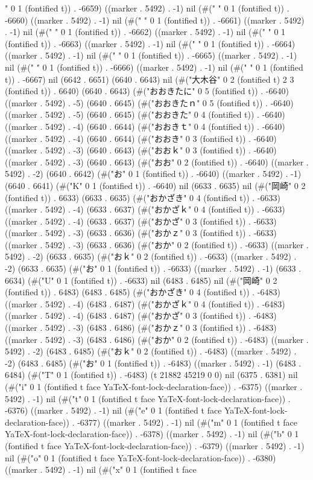" 0 1 (fontified t)) . -6659) ((marker . 5492) . -1) nil (#("	" 0 1 (fontified t)) . -6660) ((marker . 5492) . -1) nil (#(" " 0 1 (fontified t)) . -6661) ((marker . 5492) . -1) nil (#(" " 0 1 (fontified t)) . -6662) ((marker . 5492) . -1) nil (#(" " 0 1 (fontified t)) . -6663) ((marker . 5492) . -1) nil (#(" " 0 1 (fontified t)) . -6664) ((marker . 5492) . -1) nil (#(" " 0 1 (fontified t)) . -6665) ((marker . 5492) . -1) nil (#(" " 0 1 (fontified t)) . -6666) ((marker . 5492) . -1) nil (#(" " 0 1 (fontified t)) . -6667) nil (6642 . 6651) (6640 . 6643) nil (#("大木谷" 0 2 (fontified t) 2 3 (fontified t)) . 6640) (6640 . 6643) (#("おおきたに" 0 5 (fontified t)) . -6640) ((marker . 5492) . -5) (6640 . 6645) (#("おおきたｎ" 0 5 (fontified t)) . -6640) ((marker . 5492) . -5) (6640 . 6645) (#("おおきた" 0 4 (fontified t)) . -6640) ((marker . 5492) . -4) (6640 . 6644) (#("おおきｔ" 0 4 (fontified t)) . -6640) ((marker . 5492) . -4) (6640 . 6644) (#("おおき" 0 3 (fontified t)) . -6640) ((marker . 5492) . -3) (6640 . 6643) (#("おおｋ" 0 3 (fontified t)) . -6640) ((marker . 5492) . -3) (6640 . 6643) (#("おお" 0 2 (fontified t)) . -6640) ((marker . 5492) . -2) (6640 . 6642) (#("お" 0 1 (fontified t)) . -6640) ((marker . 5492) . -1) (6640 . 6641) (#("K" 0 1 (fontified t)) . -6640) nil (6633 . 6635) nil (#("岡崎" 0 2 (fontified t)) . 6633) (6633 . 6635) (#("おかざき" 0 4 (fontified t)) . -6633) ((marker . 5492) . -4) (6633 . 6637) (#("おかざｋ" 0 4 (fontified t)) . -6633) ((marker . 5492) . -4) (6633 . 6637) (#("おかざ" 0 3 (fontified t)) . -6633) ((marker . 5492) . -3) (6633 . 6636) (#("おかｚ" 0 3 (fontified t)) . -6633) ((marker . 5492) . -3) (6633 . 6636) (#("おか" 0 2 (fontified t)) . -6633) ((marker . 5492) . -2) (6633 . 6635) (#("おｋ" 0 2 (fontified t)) . -6633) ((marker . 5492) . -2) (6633 . 6635) (#("お" 0 1 (fontified t)) . -6633) ((marker . 5492) . -1) (6633 . 6634) (#("U" 0 1 (fontified t)) . -6633) nil (6483 . 6485) nil (#("岡崎" 0 2 (fontified t)) . 6483) (6483 . 6485) (#("おかざき" 0 4 (fontified t)) . -6483) ((marker . 5492) . -4) (6483 . 6487) (#("おかざｋ" 0 4 (fontified t)) . -6483) ((marker . 5492) . -4) (6483 . 6487) (#("おかざ" 0 3 (fontified t)) . -6483) ((marker . 5492) . -3) (6483 . 6486) (#("おかｚ" 0 3 (fontified t)) . -6483) ((marker . 5492) . -3) (6483 . 6486) (#("おか" 0 2 (fontified t)) . -6483) ((marker . 5492) . -2) (6483 . 6485) (#("おｋ" 0 2 (fontified t)) . -6483) ((marker . 5492) . -2) (6483 . 6485) (#("お" 0 1 (fontified t)) . -6483) ((marker . 5492) . -1) (6483 . 6484) (#("T" 0 1 (fontified t)) . -6483) (t 21882 45219 0 0) nil (6375 . 6381) nil (#("i" 0 1 (fontified t face YaTeX-font-lock-declaration-face)) . -6375) ((marker . 5492) . -1) nil (#("t" 0 1 (fontified t face YaTeX-font-lock-declaration-face)) . -6376) ((marker . 5492) . -1) nil (#("e" 0 1 (fontified t face YaTeX-font-lock-declaration-face)) . -6377) ((marker . 5492) . -1) nil (#("m" 0 1 (fontified t face YaTeX-font-lock-declaration-face)) . -6378) ((marker . 5492) . -1) nil (#("b" 0 1 (fontified t face YaTeX-font-lock-declaration-face)) . -6379) ((marker . 5492) . -1) nil (#("o" 0 1 (fontified t face YaTeX-font-lock-declaration-face)) . -6380) ((marker . 5492) . -1) nil (#("x" 0 1 (fontified t face 